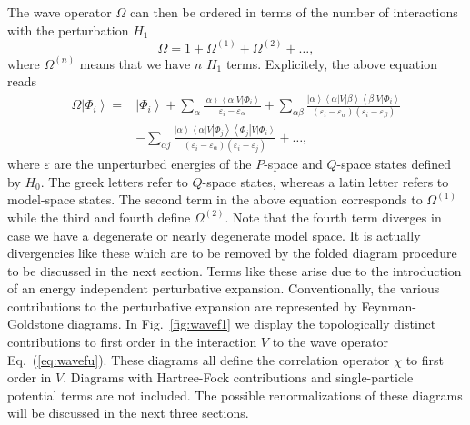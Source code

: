 The wave operator $\Omega$ can then be ordered in terms of the number
of interactions with the perturbation $H_1$
\begin{equation}
              \Omega = 1 +\Omega^{(1)} + \Omega^{(2)}+\dots ,
\end{equation}
where $\Omega^{(n)}$ means that we have $n$ $H_1$ terms. 
Explicitely, the above
equation reads
\begin{eqnarray}
         \Omega\left|\Phi_i\right\rangle=
         &{\displaystyle\left|\Phi_i\right\rangle
         +\sum_{\alpha}\frac{\left|\alpha\right\rangle
         \left\langle\alpha\right|
          V\left|\Phi_i\right\rangle}{\varepsilon_i -\varepsilon_{\alpha}}
         +\sum_{\alpha\beta}\frac{\left|\alpha\right\rangle
        \left\langle\alpha\right| V
         \left|\beta\right\rangle\left\langle\beta\right| V
         \left|\Phi_i\right\rangle }
         {(\varepsilon_i-\varepsilon_{\alpha})
       (\varepsilon_i-\varepsilon_{\beta})} }\\   \label{eq:wavefu}\nonumber
&       {\displaystyle  -\sum_{\alpha j}\frac{\left|\alpha\right\rangle
       \left\langle\alpha\right|
         V\left|\Phi_j\right\rangle
        \left\langle\Phi_j\right| V\left|\Phi_i\right\rangle}
       {(\varepsilon_i-\varepsilon_{\alpha})
      (\varepsilon_i-\varepsilon_{j})} }
       +\dots ,
\end{eqnarray}
where $\varepsilon$ are the unperturbed energies of the $P$-space
and $Q$-space states defined by $H_0$.
The greek letters refer to
$Q$-space states, whereas a latin letter refers to model-space
states.   The second term
in the above equation corresponds to $\Omega^{(1)}$ while the third
and fourth define $\Omega^{(2)}$.
Note that the fourth term diverges
in case we have a degenerate or nearly degenerate model space. It is
actually divergencies like these which are to be removed by the folded
diagram procedure to be discussed in the next section. Terms like these
arise due to the introduction of an energy independent perturbative
expansion. Conventionally, the various contributions to the
perturbative expansion are represented by Feynman-Goldstone diagrams.
In Fig.\ \ref{fig:wavef1} we display the topologically distinct
contributions to first order in the
interaction $V$ to
the wave operator Eq.\ (\ref{eq:wavefu}). These diagrams all
define the correlation operator $\chi$ to first order in $V$.
Diagrams with Hartree-Fock contributions
and single-particle potential terms 
are not included. The possible 
renormalizations of these diagrams will be discussed
in the next three sections.
